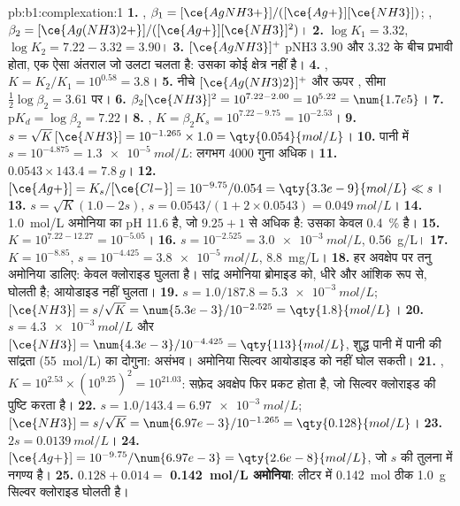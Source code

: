 \begin{solution}{pb:b1:complexation:1}
\textbf{1.} , $\beta_1 = [\ce{AgNH3+}]/([\ce{Ag+}][\ce{NH3}])$;
, $\beta_2 = [\ce{Ag(NH3)2+}]/([\ce{Ag+}][\ce{NH3}]^2)$।
\textbf{2.} $\log K_1 = 3.32$, $\log K_2 = 7.22 - 3.32 = 3.90$।
\textbf{3.} $[\ce{AgNH3}]^{+}$ pNH3 3.90 और 3.32 के बीच प्रभावी होता,
एक ऐसा अंतराल जो उलटा चलता है: उसका कोई क्षेत्र नहीं है।
\textbf{4.} , $K = K_2/K_1 = 10^{0.58} =
3.8$।
\textbf{5.} नीचे $[\ce{Ag(NH3)2}]^{+}$ और ऊपर , सीमा $\frac12\log\beta_2 = 3.61$ पर।
\textbf{6.} $\beta_2[\ce{NH3}]^2 = 10^{7.22 - 2.00} = 10^{5.22} = \num{1.7e5}$।
\textbf{7.} $\mathrm{p}K_d = \log\beta_2 = 7.22$।
\textbf{8.} , $K = \beta_2K_s =
10^{7.22 - 9.75} = 10^{-2.53}$।
\textbf{9.} $s = \sqrt{K}\,[\ce{NH3}] = 10^{-1.265} \times 1.0 =
\qty{0.054}{mol/L}$।
\textbf{10.} पानी में $s = 10^{-4.875} = \qty{1.3e-5}{mol/L}$: लगभग 4000
गुना अधिक।
\textbf{11.} $0.0543 \times 143.4 = \qty{7.8}{g}$।
\textbf{12.} $[\ce{Ag+}] = K_s/[\ce{Cl-}] = 10^{-9.75}/0.054 =
\qty{3.3e-9}{mol/L} \ll s$।
\textbf{13.} $s = \sqrt{K}(1.0 - 2s)$, $s = 0.0543/(1 + 2 \times 0.0543) =
\qty{0.049}{mol/L}$।
\textbf{14.} \qty{1.0}{mol/L} अमोनिया का pH 11.6 है, जो $9.25 + 1$ से अधिक है:
उसका केवल \qty{0.4}{\percent}  है।
\textbf{15.} $K = 10^{7.22 - 12.27} = 10^{-5.05}$।
\textbf{16.} $s = 10^{-2.525} = \qty{3.0e-3}{mol/L}$, \qty{0.56}{g/L}।
\textbf{17.} $K = 10^{-8.85}$, $s = 10^{-4.425} = \qty{3.8e-5}{mol/L}$,
\qty{8.8}{mg/L}।
\textbf{18.} हर अवक्षेप पर तनु अमोनिया डालिए: केवल क्लोराइड
घुलता है। सांद्र अमोनिया ब्रोमाइड को, धीरे और आंशिक रूप से,
घोलती है; आयोडाइड नहीं घुलता।
\textbf{19.} $s = 1.0/187.8 = \qty{5.3e-3}{mol/L}$; $[\ce{NH3}] = s/\sqrt{K}
= \num{5.3e-3}/10^{-2.525} = \qty{1.8}{mol/L}$।
\textbf{20.} $s = \qty{4.3e-3}{mol/L}$ और $[\ce{NH3}] = \num{4.3e-3}/10^{-4.425}
= \qty{113}{mol/L}$, शुद्ध पानी में पानी की सांद्रता (\qty{55}{mol/L}) का
दोगुना: असंभव। अमोनिया सिल्वर आयोडाइड को नहीं घोल सकती।
\textbf{21.} ,
$K = 10^{2.53} \times (10^{9.25})^2 = 10^{21.03}$: सफ़ेद अवक्षेप
फिर प्रकट होता है, जो सिल्वर क्लोराइड की पुष्टि करता है।
\textbf{22.} $s = 1.0/143.4 = \qty{6.97e-3}{mol/L}$; $[\ce{NH3}] =
s/\sqrt{K} = \num{6.97e-3}/10^{-1.265} = \qty{0.128}{mol/L}$।
\textbf{23.} $2s = \qty{0.0139}{mol/L}$।
\textbf{24.} $[\ce{Ag+}] = 10^{-9.75}/\num{6.97e-3} = \qty{2.6e-8}{mol/L}$,
जो $s$ की तुलना में नगण्य है।
\textbf{25.} $0.128 + 0.014 = $ \textbf{\qty{0.142}{mol/L} अमोनिया}:
लीटर में \qty{0.142}{mol} ठीक \qty{1.0}{g} सिल्वर
क्लोराइड घोलती है।
\end{solution}
